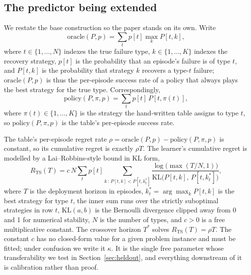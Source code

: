 \documentclass[conference]{IEEEtran}
\begin{document}
\subsection{The predictor being extended}

We restate the base construction so the paper stands on its own. Write
\begin{equation}
\mathrm{oracle}(P, p) = \sum_{t} p[t] \max_{k} P[t,k],
\label{eq:oracle}
\end{equation}
where $t \in \{1,\dots,N\}$ indexes the true failure type, $k \in
\{1,\dots,K\}$ indexes the recovery strategy, $p[t]$ is the probability that an
episode's failure is of type $t$, and $P[t,k]$ is the probability that strategy
$k$ recovers a type-$t$ failure; $\mathrm{oracle}(P,p)$ is thus the per-episode
success rate of a policy that always plays the best strategy for the true type.
Correspondingly,
\begin{equation}
\mathrm{policy}(P, \pi, p) = \sum_{t} p[t]\, P[t, \pi(t)],
\label{eq:policy}
\end{equation}
where $\pi(t) \in \{1,\dots,K\}$ is the strategy the hand-written table assigns
to type $t$, so $\mathrm{policy}(P,\pi,p)$ is the table's per-episode success
rate.

The table's per-episode regret rate $\rho = \mathrm{oracle}(P,p) -
\mathrm{policy}(P,\pi,p)$ is constant, so its cumulative regret is exactly
$\rho T$. The learner's cumulative regret is modelled by a Lai--Robbins-style
bound in KL form,
\begin{equation}
R_{\mathrm{TS}}(T) = c\,N \sum_{t} p[t]
\!\!\sum_{k\,:\,P[t,k] < P[t,k_t^{*}]}\!\!
\frac{\log\!\big(\max(T/N, 1)\big)}{\mathrm{KL}\big(P[t,k],\, P[t,k_t^{*}]\big)},
\label{eq:rts}
\end{equation}
where $T$ is the deployment horizon in episodes, $k_t^{*} = \arg\max_k P[t,k]$
is the best strategy for type $t$, the inner sum runs over the strictly
suboptimal strategies in row $t$, $\mathrm{KL}(a,b)$ is the Bernoulli
divergence clipped away from 0 and 1 for numerical stability, $N$ is the number
of types, and $c > 0$ is a free multiplicative constant. The crossover horizon
$T^{*}$ solves $R_{\mathrm{TS}}(T) = \rho T$. The constant $c$ has no
closed-form value for a given problem instance and must be fitted; under
confusion we write it $\kappa$. It is the single free parameter whose
transferability we test in Section~\ref{sec:heldout}, and everything downstream
of it is calibration rather than proof.
\end{document}
